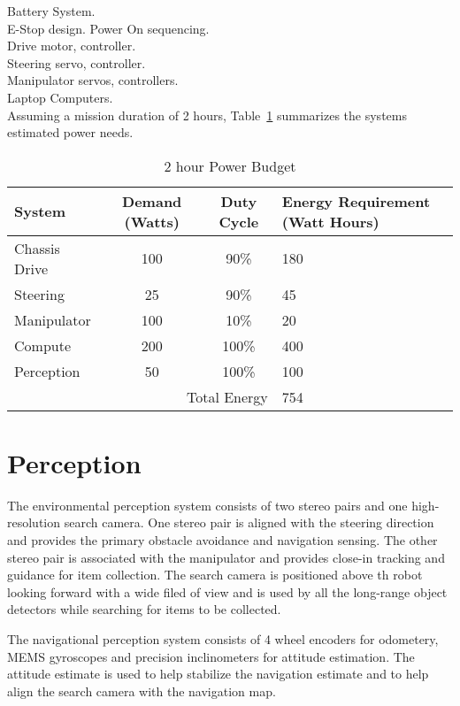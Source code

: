 \documentclass[12pt]{article}
\begin{document}
Battery System.\\

E-Stop design. Power On sequencing.\\

Drive motor, controller.\\

Steering servo, controller.\\

Manipulator servos, controllers.\\

Laptop Computers.\\

Assuming a mission duration of 2 hours, Table~\ref{power budget} summarizes the systems estimated power needs.

\begin{table}
    \caption{2 hour Power Budget}
    \label{power budget}
    \begin{tabular}{|l|c|c||p{4cm}|}
        \hline
        System & Demand (Watts) & Duty Cycle & Energy Requirement (Watt Hours)\\
        \hline
        Chassis Drive & 100 & 90\% & 180\\
        Steering & 25 & 90\% & 45\\
        Manipulator & 100 & 10\% & 20\\
        Compute & 200 & 100\% & 400\\
        Perception & 50 & 100\% & 100\\
        \hline
        \multicolumn{3}{|r||}{Total Energy} & 754\\
        \hline
    \end{tabular}
\end{table}

\section{Perception}\label{Perception}
The environmental perception system consists of two stereo pairs and one high-resolution search camera. One stereo pair is aligned with the steering direction and provides the primary obstacle avoidance and navigation sensing. The other stereo pair is associated with the manipulator and provides close-in tracking and guidance for item collection. The search camera is positioned above th robot looking forward with a wide filed of view and is used by all the long-range object detectors while searching for items to be collected.

The navigational perception system consists of 4 wheel encoders for odometery, MEMS gyroscopes and precision inclinometers for attitude estimation. The attitude estimate is used to help stabilize the navigation estimate and to help align the search camera with the navigation map.
\end{document}
